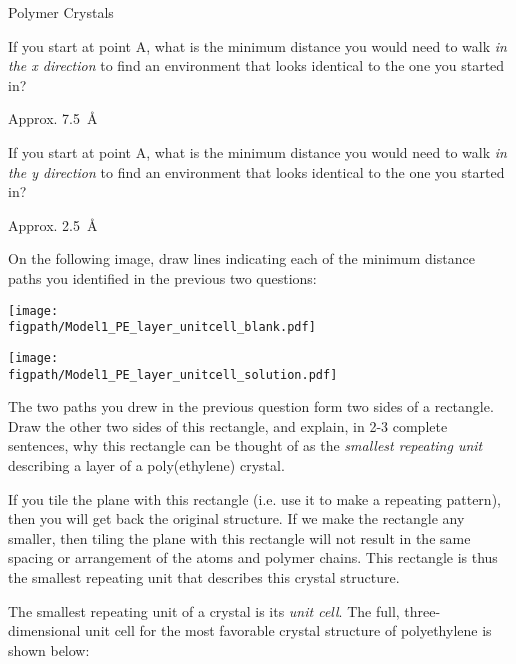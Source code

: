 \begin{activity}{Polymer Crystals}
\begin{ctqs}
	\question If you start at point A, what is the minimum distance you would need to walk \textit{in the x direction} to find an environment that looks identical to the one you started in?
	
		\begin{solution}[0.25in]{}
			Approx. 7.5~\AA
		\end{solution}
	
	\question If you start at point A, what is the minimum distance you would need to walk \textit{in the y direction} to find an environment that looks identical to the one you started in?
	
		\begin{solution}[0.25in]{}
			Approx. 2.5~\AA
		\end{solution}
	
	\question On the following image, draw lines indicating each of the minimum distance paths you identified in the previous two questions:

	\begin{solution}[1.25in]{
		\centerline{\texttt{[image: \\figpath/Model1\_PE\_layer\_unitcell\_blank.pdf]}}	
	}
		\centerline{\texttt{[image: \\figpath/Model1\_PE\_layer\_unitcell\_solution.pdf]}}
	\end{solution}
	
	\question The two paths you drew in the previous question form two sides of a rectangle.  Draw the other two sides of this rectangle, and explain, in 2-3 complete sentences, why this rectangle can be thought of as the \emph{smallest repeating unit} describing a layer of a poly(ethylene) crystal.
	
		\begin{solution}[1.75in]{}
			If you tile the plane with this rectangle (i.e. use it to make a repeating pattern), then you will get back the original structure.  If we make the rectangle any smaller, then tiling the plane with this rectangle will not result in the same spacing or arrangement of the atoms and polymer chains.  This rectangle is thus the smallest repeating unit that describes this crystal structure.
		\end{solution}
	
\end{ctqs}

\begin{infobox}

	The smallest repeating unit of a crystal is its \emph{unit cell}.  The full, three-dimensional unit cell for the most favorable crystal structure of polyethylene is shown below: \label{\labelbase:info:PEcrystal}
	

\end{infobox}
\end{activity}
